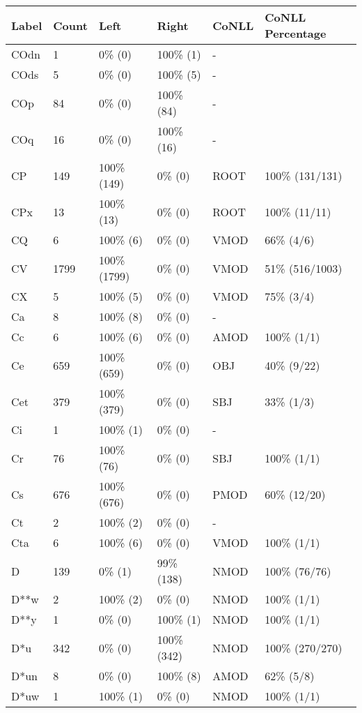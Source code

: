 \begin{figure*}
\begin{tabular}{|l|l|l|l||l|l|}
\hline
Label & Count & Left & Right & CoNLL & CoNLL Percentage\\ 
\hline
 COdn & 1 & 0\% (0) & 100\% (1) & - &  \\ 
\hline
 COds & 5 & 0\% (0) & 100\% (5) & - &  \\ 
\hline
 COp & 84 & 0\% (0) & 100\% (84) & - &  \\ 
\hline
 COq & 16 & 0\% (0) & 100\% (16) & - &  \\ 
\hline
 CP & 149 & 100\% (149) & 0\% (0) & ROOT & 100\% (131/131) \\ 
\hline
 CPx & 13 & 100\% (13) & 0\% (0) & ROOT & 100\% (11/11) \\ 
\hline
 CQ & 6 & 100\% (6) & 0\% (0) & VMOD & 66\% (4/6) \\ 
\hline
 CV & 1799 & 100\% (1799) & 0\% (0) & VMOD & 51\% (516/1003) \\ 
\hline
 CX & 5 & 100\% (5) & 0\% (0) & VMOD & 75\% (3/4) \\ 
\hline
 Ca & 8 & 100\% (8) & 0\% (0) & - &  \\ 
\hline
 Cc & 6 & 100\% (6) & 0\% (0) & AMOD & 100\% (1/1) \\ 
\hline
 Ce & 659 & 100\% (659) & 0\% (0) & OBJ & 40\% (9/22) \\ 
\hline
 Cet & 379 & 100\% (379) & 0\% (0) & SBJ & 33\% (1/3) \\ 
\hline
 Ci & 1 & 100\% (1) & 0\% (0) & - &  \\ 
\hline
 Cr & 76 & 100\% (76) & 0\% (0) & SBJ & 100\% (1/1) \\ 
\hline
 Cs & 676 & 100\% (676) & 0\% (0) & PMOD & 60\% (12/20) \\ 
\hline
 Ct & 2 & 100\% (2) & 0\% (0) & - &  \\ 
\hline
 Cta & 6 & 100\% (6) & 0\% (0) & VMOD & 100\% (1/1) \\ 
\hline
 D & 139 & 0\% (1) & 99\% (138) & NMOD & 100\% (76/76) \\ 
\hline
 D**w & 2 & 100\% (2) & 0\% (0) & NMOD & 100\% (1/1) \\ 
\hline
 D**y & 1 & 0\% (0) & 100\% (1) & NMOD & 100\% (1/1) \\ 
\hline
 D*u & 342 & 0\% (0) & 100\% (342) & NMOD & 100\% (270/270) \\ 
\hline
 D*un & 8 & 0\% (0) & 100\% (8) & AMOD & 62\% (5/8) \\ 
\hline
 D*uw & 1 & 100\% (1) & 0\% (0) & NMOD & 100\% (1/1) \\ 

\end{tabular}
\end{figure*}
